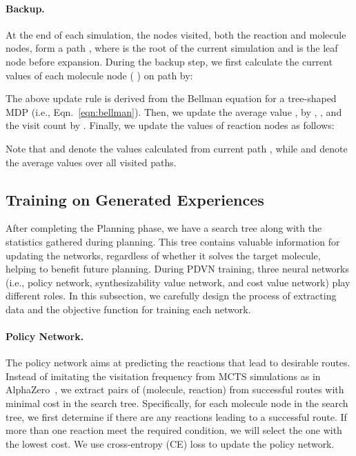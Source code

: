 \documentclass[nohyperref]{article}
\theoremstyle{plain}
\theoremstyle{definition}
\theoremstyle{remark}
\begin{document}
\paragraph{Backup.}
At the end of each simulation, the nodes visited, both the reaction and molecule nodes, form a path , where  is the root of the current simulation and  is the leaf node before expansion.
During the backup step, we first calculate the current values of each molecule node  ( ) on path  by: 

The above update rule is derived from the Bellman equation for a tree-shaped MDP (i.e., Eqn.~\ref{eqn:bellman}).  
Then, we update the average value
,  by , ,  and the visit count by .
Finally, we update the values of reaction nodes as follows:

Note that  and  denote the values calculated from current path , while  and  denote the average values over all visited paths.


\subsection{Training on Generated Experiences}\label{sec:training}
After completing the Planning phase, we have a search tree along with the statistics gathered during planning. 
This tree contains valuable information for updating the networks, regardless of whether it solves the target molecule, helping to benefit future planning.
During PDVN training, three neural networks (i.e., policy network, synthesizability value network, and cost value network) play different roles. 
In this subsection, we carefully design the process of extracting data and the objective function for training each network.

\paragraph{Policy Network.}
The policy network  aims at predicting the reactions that lead to desirable routes.
Instead of imitating the visitation frequency  from MCTS simulations as in AlphaZero~\citep{silver2017mastering, silver2018general}, 
we extract pairs of (molecule, reaction) from successful routes with minimal cost in the search tree.
Specifically, for each molecule node in the search tree, we first determine if there are any reactions leading to a successful route.
If more than one reaction meet the required condition, we will select the one with the lowest cost. We use cross-entropy (CE) loss to update the policy network.
\end{document}
